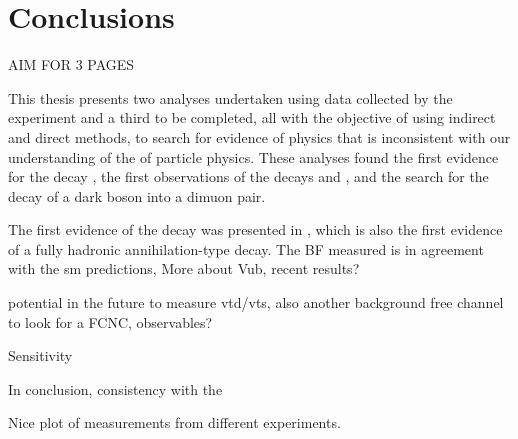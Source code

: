 \chapter{Conclusions}
\label{ch:conc}

AIM FOR 3 PAGES

This thesis presents two analyses undertaken using data collected by the \lhcb experiment
and a third to be completed, all
with the objective of using indirect and direct methods, to search for evidence of physics that is
inconsistent with our understanding of the \sm of particle physics.
These analyses found the first evidence for the decay \btodsphi, the first observations of the
decays \btokpipimumu and \btophikmumu, and the search for the decay of a dark boson into a dimuon
pair.

The first evidence of the decay \btodsphi was presented in , which is also the
first evidence of a fully hadronic annihilation-type decay.
The BF measured is in agreement with the sm predictions,
More about Vub, recent results?


\btokpipimumu \btophikmumu
potential in the future to measure vtd/vts, also another background free channel to look for a \db
FCNC, observables?


\btokstrdb
Sensitivity


In conclusion,
consistency with the \sm

Nice plot of measurements from different experiments.








